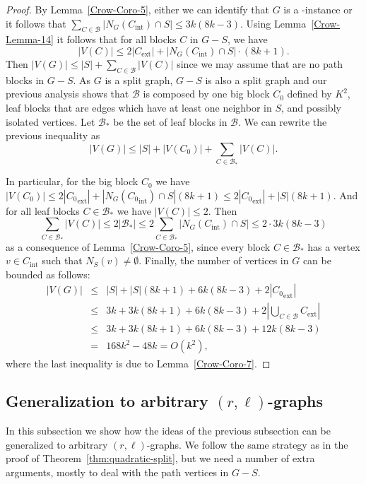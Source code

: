 \documentclass[
final
]{dmtcs-episciences}
\begin{document}
\begin{proof}
By Lemma~\ref{Crow-Coro-5}, either we can identify that $G$ is a {}-instance or it follows that $\sum_{C\in\mathcal{B}}|N_{G}(C_{\text{int}})\cap S|\leq 3k(8k-3)$. Using Lemma~\ref{Crow-Lemma-14} it follows that for all blocks $C$ in $G-S$, we have
$$
|V(C)|\leq 2|C_{\text{ext}}|+|N_G(C_{\text{int}})\cap S| \cdot (8k+1).
$$
	Then $|V(G)|\leq |S|+\sum_{C\in\mathcal{B}}{|V(C)|}$ since we may assume that are no path blocks in $G-S$. As $G$ is a split graph, $G-S$ is also a split graph and our previous analysis shows that $\mathcal{B}$ is composed by one big block $C_0$ defined by $K^2$, leaf blocks that are edges which have at least one neighbor in $S$, and possibly isolated vertices. Let $\mathcal{B_*}$ be the set of leaf blocks in $\mathcal{B}$. We can rewrite the previous inequality as
$$
|V(G)|\leq |S|+|V(C_0)|+\sum_{C\in\mathcal{B_*}}{|V(C)|}.
$$

\newpage
In particular, for the big block $C_0$ we have $|V(C_0)|\leq 2|{C_0}_{\text{ext}}|+|N_G({C_0}_{\text{int}})\cap S|(8k+1)\leq 2|{C_0}_{\text{ext}}|+|S|(8k+1)$. And for all leaf blocks  $C \in \mathcal{B_*}$ we have $|V(C)|\leq 2$.
	Then
$$
\sum_{C\in\mathcal{B_*}}{|V(C)|}\leq 2|\mathcal{B_*}|\leq 2\sum_{C\in\mathcal{B_*}}{|N_G(C_{\text{int}})\cap S|}\leq 2\cdot 3k(8k-3)
$$
as a consequence of Lemma~\ref{Crow-Coro-5}, since every block $C \in \mathcal{B_*}$ has a vertex $v \in C_{\text{int}}$ such that $N_S(v)\neq\emptyset$.
	Finally, the number of vertices in $G$ can be bounded as follows:
\begin{eqnarray*}
|V(G)| & \leq & |S|+|S|(8k+1)+6k(8k-3)+2|{C_0}_{\text{ext}}| \\
& \leq & 3k+3k(8k+1)+6k(8k-3)+2|\bigcup_{C\in\mathcal{B}}C_{\text{ext}}|\\
& \leq &  3k+3k(8k+1)+6k(8k-3)+12k(8k-3) \\
& = &168k^2 - 48k = O(k^2),
\end{eqnarray*}
where the last inequality is due to Lemma~\ref{Crow-Coro-7}.
\end{proof}



\subsection{Generalization to arbitrary $(r,\ell)$-graphs}
\label{subsec:quadratic-general}

In this subsection we show how the ideas of the previous subsection can be generalized to arbitrary $(r,\ell)$-graphs. We follow the same strategy as in the proof of Theorem~\ref{thm:quadratic-split}, but we need a number of extra arguments, mostly to deal with the path vertices in $G-S$.
\end{document}
